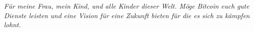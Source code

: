
\newpage \vspace*{6cm}
\thispagestyle{empty}
\begin{center}
  \Large \emph{
  Für meine Frau, mein Kind, und alle Kinder dieser Welt. Möge Bitcoin euch gute
  Dienste leisten und eine Vision für eine Zukunft bieten für die es sich zu
  kämpfen lohnt.
  }
\end{center}
